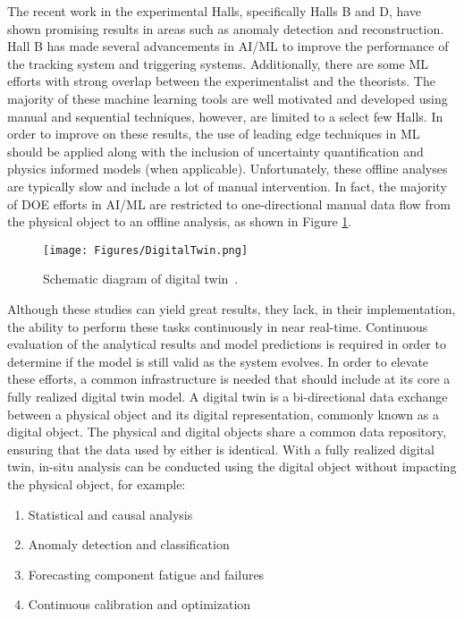 The recent work in the experimental Halls, specifically Halls B and D, have shown promising results in areas such as anomaly detection and reconstruction. 
Hall B has made several advancements in AI/ML to improve the performance of the tracking system and triggering systems. 
Additionally, there are some ML efforts with strong overlap between the experimentalist and the theorists. 
The majority of these machine learning tools are well motivated and developed using manual and sequential techniques, however, are limited to a select few Halls. 
In order to improve on these results, the use of leading edge techniques in ML should be applied along with the inclusion of uncertainty quantification and physics informed models (when applicable). 
Unfortunately, these offline analyses are typically slow and include a lot of manual intervention.
In fact, the majority of DOE efforts in AI/ML are restricted to one-directional manual data flow from the physical object to an offline analysis, as shown in Figure \ref{DigitalTwin}.
\begin{figure}[tbh]
  \centering
  \texttt{[image: Figures/DigitalTwin.png]}
  \caption{Schematic diagram of digital twin~\cite{DT9103025}.}
  \label{DigitalTwin}
\end{figure}
Although these studies can yield great results, they lack, in their implementation, the ability to perform these tasks continuously in near real-time.
Continuous evaluation of the analytical results and model predictions is required in order to determine if the model is still valid as the system evolves.
In order to elevate these efforts, a common infrastructure is needed that should include at its core a fully realized digital twin model. 
A digital twin is a bi-directional data exchange between a physical object and its digital representation, commonly known as a digital object. 
The physical and digital objects share a common data repository, ensuring that the data used by either is identical. With a fully realized digital twin, in-situ analysis can be conducted using the digital object without impacting the physical object, for example:
\begin{enumerate}
    \item Statistical and causal analysis
    \item Anomaly detection and classification
    \item Forecasting component fatigue and failures
    \item Continuous calibration and optimization
\end{enumerate}
